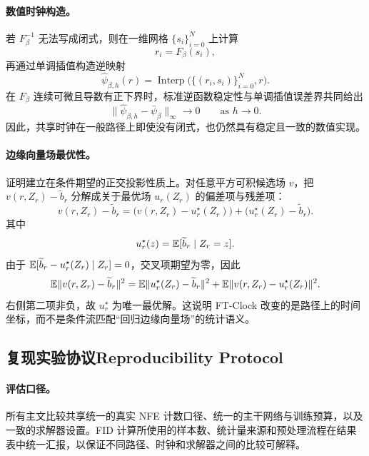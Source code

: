 \paragraph{数值时钟构造。}
若 $F_{\beta}^{-1}$ 无法写成闭式，则在一维网格 $\{s_i\}_{i=0}^N$ 上计算
\begin{equation}
  r_i = F_{\beta}(s_i),
\end{equation}
再通过单调插值构造逆映射
\begin{equation}
  \hat{\psi}_{\beta,h}(r)
  =
  \operatorname{Interp}\bigl(\{(r_i,s_i)\}_{i=0}^N,r\bigr).
\end{equation}
在 $F_{\beta}$ 连续可微且导数有正下界时，标准逆函数稳定性与单调插值误差界共同给出
\begin{equation}
  \|\hat{\psi}_{\beta,h}-\bar{\psi}_{\beta}\|_{\infty} \to 0
  \qquad \text{as } h \to 0.
\end{equation}
因此，共享时钟在一般路径上即使没有闭式，也仍然具有稳定且一致的数值实现。

\paragraph{边缘向量场最优性。}
证明建立在条件期望的正交投影性质上。对任意平方可积候选场 $v$，把
\(
  v(r,Z_r)-\widetilde{b}_r
\)
分解成关于最优场 $u_r(Z_r)$ 的偏差项与残差项：
\begin{equation}
  v(r,Z_r)-\widetilde{b}_r
  =
  \bigl(v(r,Z_r)-u_r^\star(Z_r)\bigr)
  +
  \bigl(u_r^\star(Z_r)-\widetilde{b}_r\bigr).
\end{equation}
其中
\begin{equation}
  u_r^\star(z)=\mathbb{E}[\widetilde{b}_r \mid Z_r=z].
\end{equation}
由于 $\mathbb{E}[\widetilde{b}_r-u_r^\star(Z_r)\mid Z_r]=0$，交叉项期望为零，因此
\begin{equation}
  \mathbb{E}\|v(r,Z_r)-\widetilde{b}_r\|^2
  =
  \mathbb{E}\|u_r^\star(Z_r)-\widetilde{b}_r\|^2
  +
  \mathbb{E}\|v(r,Z_r)-u_r^\star(Z_r)\|^2.
\end{equation}
右侧第二项非负，故 $u_r^\star$ 为唯一最优解。这说明 FT-Clock 改变的是路径上的时间坐标，而不是条件流匹配“回归边缘向量场”的统计语义。

\subsection{\ifinternalcn 复现实验协议\else Reproducibility Protocol\fi}

\paragraph{评估口径。}
所有主文比较共享统一的真实 NFE 计数口径、统一的主干网络与训练预算，以及一致的求解器设置。FID 计算所使用的样本数、统计量来源和预处理流程在结果表中统一汇报，以保证不同路径、时钟和求解器之间的比较可解释。

